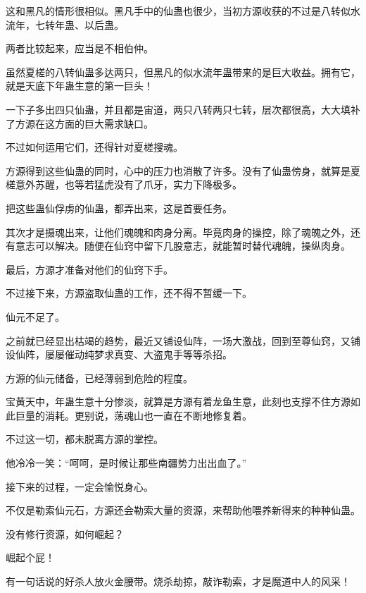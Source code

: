 \begin{this_body}
这和黑凡的情形很相似。黑凡手中的仙蛊也很少，当初方源收获的不过是八转似水流年，七转年蛊、以后蛊。

两者比较起来，应当是不相伯仲。

虽然夏槎的八转仙蛊多达两只，但黑凡的似水流年蛊带来的是巨大收益。拥有它，就是天底下年蛊生意的第一巨头！

一下子多出四只仙蛊，并且都是宙道，两只八转两只七转，层次都很高，大大填补了方源在这方面的巨大需求缺口。

不过如何运用它们，还得针对夏槎搜魂。

方源得到这些仙蛊的同时，心中的压力也消散了许多。没有了仙蛊傍身，就算是夏槎意外苏醒，也等若猛虎没有了爪牙，实力下降极多。

把这些蛊仙俘虏的仙蛊，都弄出来，这是首要任务。

其次才是摄魂出来，让他们魂魄和肉身分离。毕竟肉身的操控，除了魂魄之外，还有意志可以解决。随便在仙窍中留下几股意志，就能暂时替代魂魄，操纵肉身。

最后，方源才准备对他们的仙窍下手。

不过接下来，方源盗取仙蛊的工作，还不得不暂缓一下。

仙元不足了。

之前就已经显出枯竭的趋势，最近又铺设仙阵，一场大激战，回到至尊仙窍，又铺设仙阵，屡屡催动纯梦求真变、大盗鬼手等等杀招。

方源的仙元储备，已经薄弱到危险的程度。

宝黄天中，年蛊生意十分惨淡，就算是方源有着龙鱼生意，此刻也支撑不住方源如此巨量的消耗。更别说，荡魂山也一直在不断地修复着。

不过这一切，都未脱离方源的掌控。

他冷冷一笑：“呵呵，是时候让那些南疆势力出出血了。”

接下来的过程，一定会愉悦身心。

不仅是勒索仙元石，方源还会勒索大量的资源，来帮助他喂养新得来的种种仙蛊。

没有修行资源，如何崛起？

崛起个屁！

有一句话说的好杀人放火金腰带。烧杀劫掠，敲诈勒索，才是魔道中人的风采！

\end{this_body}

